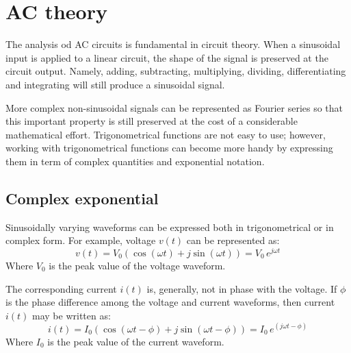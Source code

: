 \chapter{AC theory}

\begin{summary}
The analysis od AC circuits is fundamental in circuit theory. When a sinusoidal input is applied to a linear circuit, the shape of the signal is preserved at the circuit output. Namely, adding, subtracting, multiplying, dividing, differentiating and integrating will still produce a sinusoidal signal.

More complex non-sinusoidal signals can be represented as Fourier series so that this important property is still preserved at the cost of a considerable mathematical effort. Trigonometrical functions are not easy to use; however, working with trigonometrical functions can become more handy by expressing them in term of complex quantities and exponential notation.
\end{summary}

\section{Complex exponential}
Sinusoidally varying waveforms can be expressed both in trigonometrical or in complex form. For example, voltage $v(t)$ can be represented as:
\begin{equation}
v(t) = V_0\left(\cos(\omega t) + j\sin(\omega t)\right) = V_0\,e^{j\omega t} 
\end{equation}
Where $V_0$ is the peak value of the voltage waveform.

The corresponding current $i(t)$ is, generally, not in phase with the voltage. If $\phi$ is the phase difference among the voltage and current waveforms, then current $i(t)$ may be written as:
\begin{equation}
i(t) = I_0\left(\cos(\omega t -\phi) + j\sin(\omega t -\phi)\right) = I_0\,e^{(j\omega t -\phi)} 
\end{equation}
Where $I_0$ is the peak value of the current waveform.

